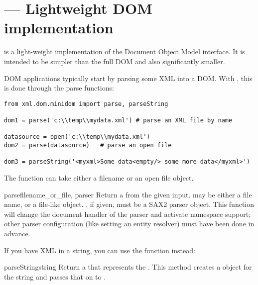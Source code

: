\section{ ---
         Lightweight DOM implementation}



 is a light-weight implementation of the
Document Object Model interface.  It is intended to be
simpler than the full DOM and also significantly smaller.

DOM applications typically start by parsing some XML into a DOM.  With
, this is done through the parse functions:

\begin{verbatim}
from xml.dom.minidom import parse, parseString

dom1 = parse('c:\\temp\\mydata.xml') # parse an XML file by name

datasource = open('c:\\temp\\mydata.xml')
dom2 = parse(datasource)   # parse an open file

dom3 = parseString('<myxml>Some data<empty/> some more data</myxml>')
\end{verbatim}

The  function can take either a filename or an open
file object.

\begin{funcdesc}{parse}{filename_or_file{, parser}}
  Return a  from the given input. 
  may be either a file name, or a file-like object. , if
  given, must be a SAX2 parser object. This function will change the
  document handler of the parser and activate namespace support; other
  parser configuration (like setting an entity resolver) must have been
  done in advance.
\end{funcdesc}

If you have XML in a string, you can use the
 function instead:

\begin{funcdesc}{parseString}{string}
  Return a  that represents the . This
  method creates a  object for the string and passes
  that on to .
\end{funcdesc}


